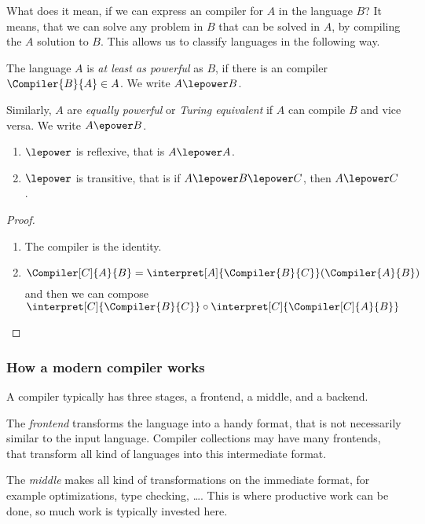 What does it mean, if we can express an compiler for $A$ in the language 
$B$? It means, that we can solve any problem in $B$ that can be solved in $A$, 
by compiling the $A$ solution to $B$. This allows us to classify languages 
in the following way.

\begin{defn}
	\label{def:power}
	The language $A$ is {\em at least as powerful} as $B$, if there is an 
	compiler $\Compiler{B}{A}\in A$. We write $A \lepower B$.

	Similarly, $A$ are {\em equally powerful} or {\em Turing equivalent} if $A$
	can compile $B$ and vice versa. We write $A \epower B$.
\end{defn}

\begin{theorem}
	\begin{enumerate}
		\item $\lepower$ is reflexive, that is $A\lepower A$.
		\item $\lepower$ is transitive, that is if $A\lepower B\lepower C$, then $A\lepower C$.
	\end{enumerate}
\end{theorem}
\begin{proof}
	\begin{enumerate}
		\item The compiler is the identity.
		\item \[\Compiler[C]{A}{B} = \interpret[A]{\Compiler{B}{C}}(\Compiler{A}{B})\]
			and then we can compose $\interpret[C]{\Compiler{B}{C}} \circ \interpret[C]{\Compiler[C]{A}{B}}$
	\end{enumerate}
\end{proof}

\subsubsection{How a modern compiler works}
A compiler typically has three stages, a frontend, a middle, and a backend.

The {\em frontend} transforms the language into a handy format, that is not 
necessarily similar to the input language. Compiler collections may have many 
frontends, that transform all kind of languages into this intermediate format.

The {\em middle} makes all kind of transformations on the immediate format, 
for example optimizations, type checking, \dots. This is where productive 
work can be done, so much work is typically invested here.

